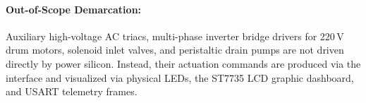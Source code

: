 \paragraph{Out-of-Scope Demarcation:}
Auxiliary high-voltage AC triacs, multi-phase inverter bridge drivers for 220\,V drum motors, solenoid inlet valves, and peristaltic
drain pumps are not driven directly by power silicon. Instead, their actuation commands are produced via the
 interface and visualized via physical LEDs, the ST7735 LCD graphic dashboard, and USART
telemetry frames.
